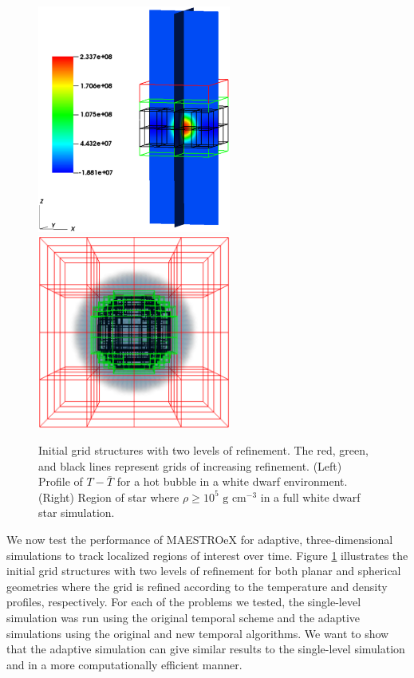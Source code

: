 \documentclass{aastex62}
\begin{document}
\begin{figure}[htb]
\begin{center}
\includegraphics[width=2.5in]{reacting_bubble_amr.eps} \hspace{2.5em}
\includegraphics[width=2.5in]{wdconvect_amr_3grid.eps}
\caption{\label{fig:amr_grids} Initial grid structures with two levels of refinement.
         The red, green, and black lines represent grids of increasing refinement.
         (Left) Profile of $T - \bar{T}$ for a hot bubble in a white dwarf environment.
         (Right) Region of star where $\rho\ge 10^5 \text{ g cm}^{-3}$ in a full white dwarf star simulation. }
\end{center}
\end{figure}

We now test the performance of MAESTROeX for adaptive, three-dimensional simulations to track localized regions of interest over time. Figure \ref{fig:amr_grids} illustrates the initial grid structures with two levels of refinement for both planar and spherical geometries where the grid is refined according to the temperature and density profiles, respectively. For each of the problems we tested, the single-level simulation was run using the original temporal scheme and the adaptive simulations using the original and new temporal algorithms. We want to show that the adaptive simulation can give similar results to the single-level simulation and in a more computationally efficient manner.
\end{document}
